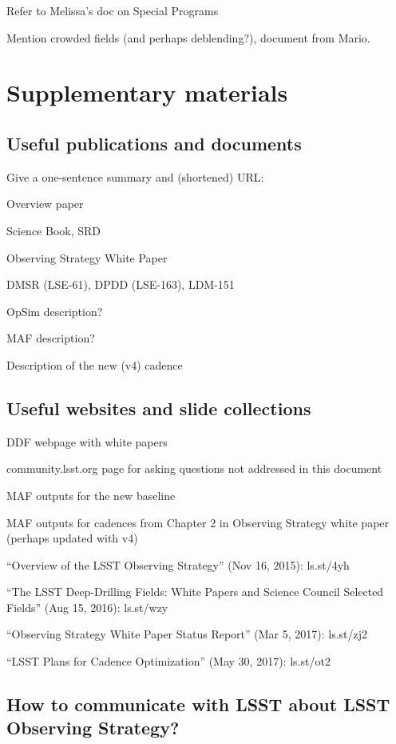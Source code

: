 \documentclass[DM,lsstdraft,toc,usenatbib]{lsstdoc}
\begin{document}
Refer to Melissa's doc on Special Programs 

Mention crowded fields (and perhaps deblending?), document from Mario. 



\section{Supplementary materials} 


\subsection{Useful publications and documents}

Give a one-sentence summary and (shortened) URL:  

Overview paper

Science Book, SRD 

Observing Strategy White Paper 

DMSR (LSE-61), DPDD (LSE-163), LDM-151 

OpSim description?  

MAF description?  

Description of the new (v4) cadence 

\subsection{Useful websites and slide collections}

DDF webpage with white papers 

community.lsst.org page for asking questions not addressed in this document 

MAF outputs for the new baseline

MAF outputs for cadences from Chapter 2 in Observing Strategy white paper (perhaps
updated with v4)

``Overview of the LSST Observing Strategy'' (Nov 16, 2015): ls.st/4yh

``The LSST Deep-Drilling Fields: White Papers and Science Council Selected Fields'' (Aug 15, 2016): ls.st/wzy

``Observing Strategy White Paper Status Report'' (Mar 5, 2017): ls.st/zj2

``LSST Plans for Cadence Optimization'' (May 30, 2017): ls.st/ot2 


\subsection{How to communicate with LSST about LSST Observing Strategy?} 
\end{document}
